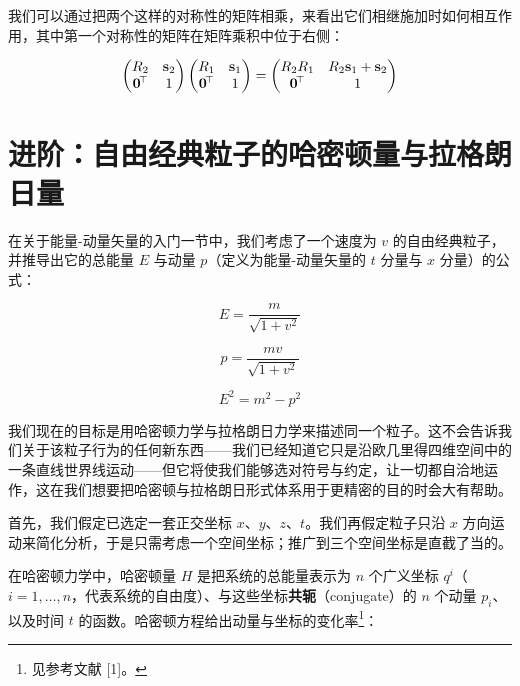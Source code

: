 我们可以通过把两个这样的对称性的矩阵相乘，来看出它们相继施加时如何相互作用，其中第一个对称性的矩阵在矩阵乘积中位于右侧：

\begin{equation}
\begin{pmatrix}
R_{2} & \mathbf{s}_{2}\\
\mathbf{0}^{\!\top} & 1
\end{pmatrix}
\begin{pmatrix}
R_{1} & \mathbf{s}_{1}\\
\mathbf{0}^{\!\top} & 1
\end{pmatrix}
=
\begin{pmatrix}
R_{2}R_{1} & R_{2}\mathbf{s}_{1} + \mathbf{s}_{2}\\
\mathbf{0}^{\!\top} & 1
\end{pmatrix}
\end{equation}

\section{进阶：自由经典粒子的哈密顿量与拉格朗日量}

在关于能量-动量矢量的入门一节中，我们考虑了一个速度为 $v$ 的自由经典粒子，并推导出它的总能量 $E$ 与动量 $p$（定义为能量-动量矢量的 $t$ 分量与 $x$ 分量）的公式：

\begin{equation}
E = \frac{m}{\sqrt{1+v^{2}}} \tag{1}
\end{equation}

\begin{equation}
p = \frac{mv}{\sqrt{1+v^{2}}} \tag{2}
\end{equation}

\begin{equation}
E^{2} = m^{2} - p^{2} \tag{3}
\end{equation}

我们现在的目标是用哈密顿力学与拉格朗日力学来描述同一个粒子。这不会告诉我们关于该粒子行为的任何新东西——我们已经知道它只是沿欧几里得四维空间中的一条直线世界线运动——但它将使我们能够选对符号与约定，让一切都自洽地运作，这在我们想要把哈密顿与拉格朗日形式体系用于更精密的目的时会大有帮助。

首先，我们假定已选定一套正交坐标 $x$、$y$、$z$、$t$。我们再假定粒子只沿 $x$ 方向运动来简化分析，于是只需考虑一个空间坐标；推广到三个空间坐标是直截了当的。

在哈密顿力学中，哈密顿量 $H$ 是把系统的总能量表示为 $n$ 个广义坐标 $q^{i}$（$i=1,\dots,n$，代表系统的自由度）、与这些坐标\textbf{共轭}（conjugate）的 $n$ 个动量 $p_{i}$、以及时间 $t$ 的函数。哈密顿方程给出动量与坐标的变化率\footnote{见参考文献 [1]。}：


